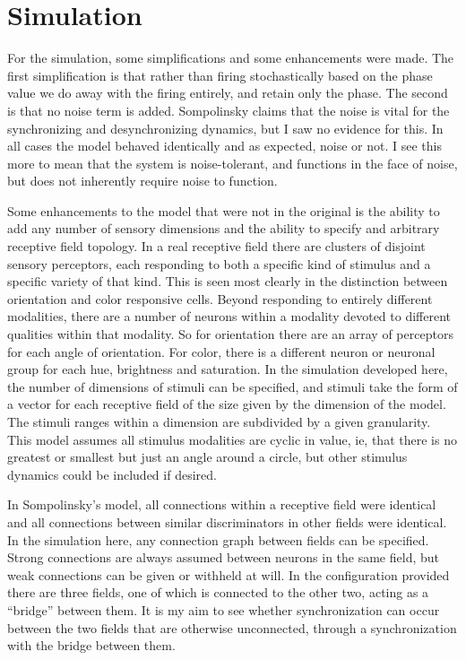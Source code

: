 \documentclass[12pt]{article}
\begin{document}
\section{Simulation}

For the simulation, some simplifications and some enhancements were made.  The first simplification is that rather than firing stochastically based on the phase value we do away with the firing entirely, and retain only the phase.  The second is that no noise term is added.  Sompolinsky claims that the noise is vital for the synchronizing and desynchronizing dynamics, but I saw no evidence for this.  In all cases the model behaved identically and as expected, noise or not.  I see this more to mean that the system is noise-tolerant, and functions in the face of noise, but does not inherently require noise to function.  

Some enhancements to the model that were not in the original is the ability to add any number of sensory dimensions and the ability to specify and arbitrary receptive field topology.  In a real receptive field there are clusters of disjoint sensory perceptors, each responding to both a specific kind of stimulus and a specific variety of that kind.  This is seen most clearly in the distinction between orientation and color responsive cells.  Beyond responding to entirely different modalities, there are a number of neurons within a modality devoted to different qualities within that modality.  So for orientation there are an array of perceptors for each angle of orientation.  For color, there is a different neuron or neuronal group for each hue, brightness and saturation.  In the simulation developed here, the number of dimensions of stimuli can be specified, and stimuli take the form of a vector for each receptive field of the size given by the dimension of the model.  The stimuli ranges within a dimension are subdivided by a given granularity.  This model assumes all stimulus modalities are cyclic in value, ie, that there is no greatest or smallest but just an angle around a circle, but other stimulus dynamics could be included if desired.

In Sompolinsky's model, all connections within a receptive field were identical and all connections between similar discriminators in other fields were identical.  In the simulation here, any connection graph between fields can be specified.  Strong connections are always assumed between neurons in the same field, but weak connections can be given or withheld at will.  In the configuration provided there are three fields, one of which is connected to the other two, acting as a ``bridge'' between them.  It is my aim to see whether synchronization can occur between the two fields that are otherwise unconnected, through a synchronization with the bridge between them.  
\end{document}
